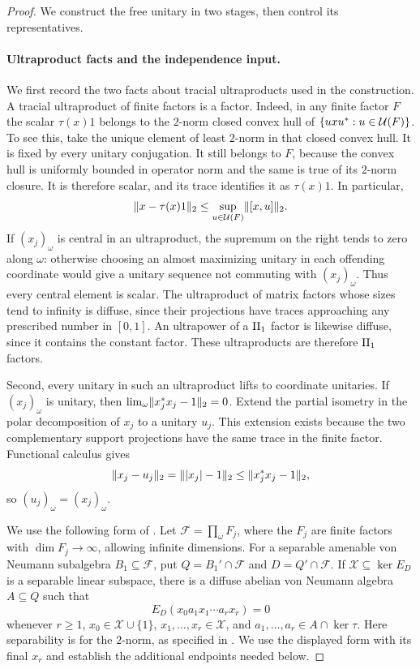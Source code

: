 \begin{proof}
We construct the free unitary in two stages, then control its representatives.

\paragraph{Ultraproduct facts and the independence input.}
We first record the two facts about tracial ultraproducts used in the
construction.  A tracial ultraproduct of finite factors is a factor.
Indeed, in any finite factor $F$ the scalar $\tau(x)1$ belongs to the
$2$-norm closed convex hull of $\{uxu^*:u\in\mathcal U(F)\}$.  To see this,
take the unique element of least $2$-norm in that closed convex hull.
It is fixed by every unitary conjugation.  It still belongs to $F$,
because the convex hull is uniformly bounded in operator norm and
the same is true of its $2$-norm closure.  It is therefore scalar,
and its trace identifies it as $\tau(x)1$.  In particular,
\[
 \lVert x-\tau(x)1\rVert_2
 \leq\sup_{u\in\mathcal U(F)}\lVert[x,u]\rVert_2.
\]
If $(x_j)_\omega$ is central in an ultraproduct, the supremum on the
right tends to zero along $\omega$: otherwise choosing an almost
maximizing unitary in each offending coordinate would give a unitary
sequence not commuting with $(x_j)_\omega$.  Thus every central
element is scalar.  The ultraproduct of matrix factors whose sizes
tend to infinity is diffuse, since their projections have traces
approaching any prescribed number in $[0,1]$.  An ultrapower of a
$\mathrm{II}_1$ factor is likewise diffuse, since it contains the constant
factor.  These ultraproducts are therefore $\mathrm{II}_1$ factors.

Second, every unitary in such an ultraproduct lifts to coordinate
unitaries.  If $(x_j)_\omega$ is unitary, then
$\lim_\omega\lVert x_j^*x_j-1\rVert_2=0$.  Extend the partial isometry in
the polar decomposition of $x_j$ to a unitary $u_j$.  This extension
exists because the two complementary support projections have the
same trace in the finite factor.  Functional calculus gives
\[
 \lVert x_j-u_j\rVert_2
 =\lVert|x_j|-1\rVert_2
 \leq\lVert x_j^*x_j-1\rVert_2,
\]
so $(u_j)_\omega=(x_j)_\omega$.

We use the following form of
\citet[Theorem~0.1(b)]{Popa2014}.  Let
$\mathcal F=\prod_\omega F_j$, where the $F_j$ are finite factors
with $\dim F_j\longrightarrow\infty$, allowing infinite dimensions.
For a separable amenable von Neumann subalgebra $B_1\subseteq\mathcal F$,
put $Q=B_1'\cap\mathcal F$ and $D=Q'\cap\mathcal F$.
If $\mathcal X\subseteq\ker E_D$ is a separable linear subspace,
there is a diffuse abelian von Neumann algebra $A\subseteq Q$ such that
\begin{equation}\label{eq:popa-exact-endpoints}
 E_D(x_0a_1x_1\cdots a_rx_r)=0
\end{equation}
whenever $r\geq1$, $x_0\in\mathcal X\cup\{1\}$,
$x_1,\ldots,x_r\in\mathcal X$, and
$a_1,\ldots,a_r\in A\cap\ker\tau$.
Here separability is for the $2$-norm, as specified in
\cite[Section~1.1]{Popa2014}.  We use the displayed form with its
final $x_r$ and establish the additional endpoints needed below.


\end{proof}
